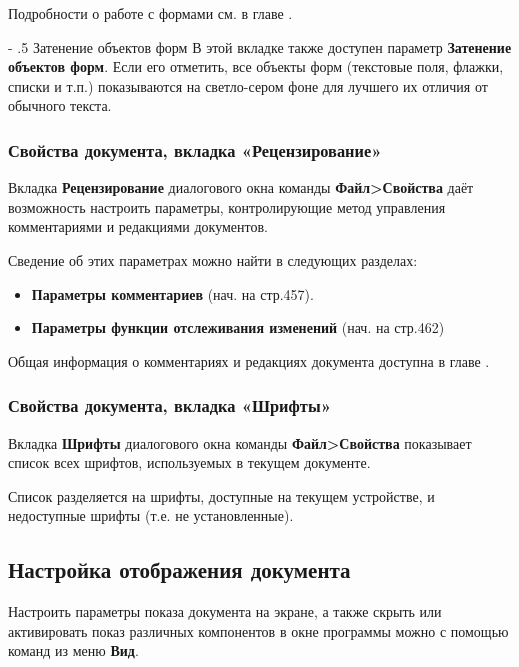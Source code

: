 ﻿\documentclass[a4paper,10pt]{article}
\makeatletter
\renewcommand\paragraph{%
   \@startsection{paragraph}{4}{0mm}%
      {-\baselineskip}%
      {.5\baselineskip}%
      {\normalfont\normalsize\bfseries}}
\makeatother
\begin{document}
 Подробности о работе с формами см. в главе .
 
 \paragraph{Затенение объектов форм}
 В этой вкладке также доступен параметр \textbf{Затенение объектов форм}. Если его отметить, все объекты форм (текстовые поля, флажки, списки и т.п.) показываются на светло-сером фоне для лучшего их отличия от обычного текста.
 
 \subsubsection{Свойства документа, вкладка «Рецензирование»}
 Вкладка \textbf{Рецензирование} диалогового окна команды \textbf{Файл>Свойства} даёт возможность настроить параметры, контролирующие метод управления комментариями и редакциями документов.
 
 Сведение об этих параметрах можно найти в следующих разделах:
 \begin{itemize}
  \item \textbf{Параметры комментариев} (нач. на стр.457).
  \item \textbf{Параметры функции отслеживания изменений} (нач. на стр.462)
 \end{itemize}

 Общая информация о комментариях и редакциях документа доступна в главе .
 
 \subsubsection{Свойства документа, вкладка «Шрифты»}
 Вкладка \textbf{Шрифты} диалогового окна команды \textbf{Файл>Свойства} показывает список всех шрифтов, используемых в текущем документе.
 
 Список разделяется на шрифты, доступные на текущем устройстве, и недоступные шрифты (т.е. не установленные).
 
 \subsection{Настройка отображения документа}
 Настроить параметры показа документа на экране, а также скрыть или активировать показ различных компонентов в окне программы можно с помощью команд из меню \textbf{Вид}.
 
\end{document}
